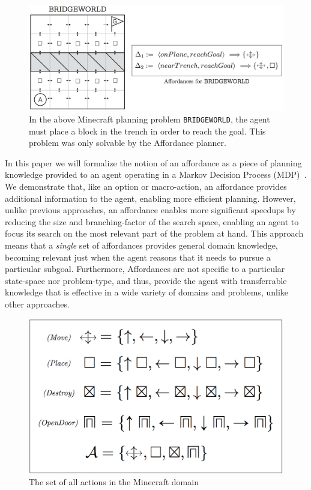 \documentclass[]{article}
\begin{document}
\begin{figure}
\centering
\includegraphics[scale = 0.18]{figures/bridgeworld_aff.png}
\caption{In the above Minecraft planning problem \texttt{BRIDGEWORLD}, the agent must place a block in the trench in order to reach the goal. This problem was only solvable by the Affordance planner.\label{fig:bridgeworld_aff}}
\end{figure}

In this paper we will formalize
the notion of an affordance as a piece of planning knowledge provided
to an agent operating in a Markov Decision Process
(MDP)~\citep{kaelbling99}.  We demonstrate that, like an option or
macro-action, an affordance provides additional information to the
agent, enabling more efficient planning.  However, unlike previous
approaches, an affordance enables more significant speedups by
reducing the size and branching-factor of the search space, enabling
an agent to focus its search on the most relevant part of the problem
at hand.  This approach means that a {\em single} set of affordances
provides general domain knowledge, becoming relevant just when the
agent reasons that it needs to pursue a particular subgoal.  Furthermore,
Affordances are not specific to a particular state-space nor problem-type, and thus, provide
the agent with transferrable knowledge that is effective in a wide variety of
domains and problems, unlike other approaches.


\begin{figure}
\centering
\includegraphics[scale = 0.15]{figures/all_actions.png}
\caption{The set of all actions in the Minecraft domain \label{fig:all_actions}}
\end{figure}
\end{document}
